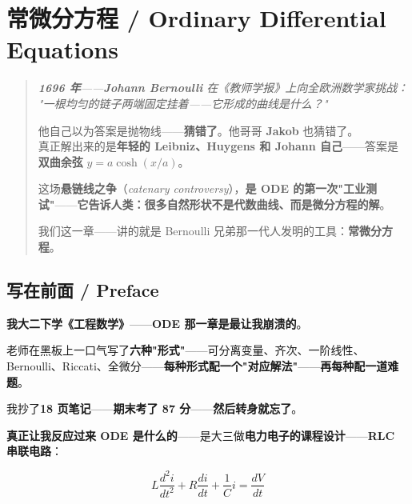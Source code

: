 
\chapter{常微分方程 / Ordinary Differential Equations}
\label{ch:ode}

\begin{quote}\itshape
\textbf{1696 年}——\textbf{Johann Bernoulli} 在《教师学报》上向全欧洲数学家挑战：
"一根均匀的链子两端固定挂着——它形成的曲线是什么？"

\medskip

他自己以为答案是抛物线——\textbf{猜错了}。他哥哥 \textbf{Jakob} 也猜错了。\\
真正解出来的是\textbf{年轻的 Leibniz、Huygens 和 Johann 自己}——答案是\textbf{双曲余弦} $y = a \cosh(x/a)$。

\medskip

这场\textbf{悬链线之争}（\textit{catenary controversy}），\textbf{是 ODE 的第一次"工业测试"}——\textbf{它告诉人类：很多自然形状不是代数曲线、而是微分方程的解}。

\medskip

我们这一章——讲的就是 Bernoulli 兄弟那一代人发明的工具：\textbf{常微分方程}。
\end{quote}

\section{写在前面 / Preface}

\textbf{我大二下学《工程数学》}——\textbf{ODE 那一章是最让我崩溃的}。

老师在黑板上一口气写了\textbf{六种"形式"}——可分离变量、齐次、一阶线性、Bernoulli、Riccati、全微分——\textbf{每种形式配一个"对应解法"}——\textbf{再每种配一道难题}。

我抄了\textbf{18 页笔记}——\textbf{期末考了 87 分}——\textbf{然后转身就忘了}。

\textbf{真正让我反应过来 ODE 是什么的}——是大三做\textbf{电力电子的课程设计}——\textbf{RLC 串联电路}：

\[
L \frac{d^2 i}{dt^2} + R \frac{di}{dt} + \frac{1}{C} i = \frac{dV}{dt}
\]

